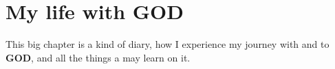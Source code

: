 \documentclass[12pt,a4paper]{article}
\newcommand{\God}[0]{\textbf{GOD}}
\newcommand{\Jesus}[0]{\textbf{JESUS}}
\newcommand{\q}[1]{\char"22{#1}\char"22 }
\begin{document}
%
	\section{My life with {\God}} \label{MeinLebenMitGott}
		This big chapter is a kind of diary,
		how I experience my journey with and to {\God},
		and all the things a may learn on it.
%	
\end{document}
